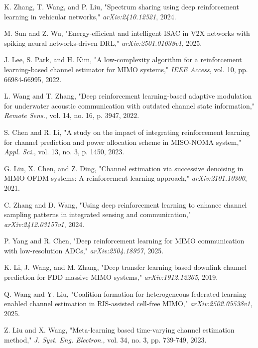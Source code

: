 \documentclass[journal,twocolumn]{IEEEtran}
\begin{document}
\begin{thebibliography}{20}
K. Zhang, T. Wang, and P. Liu, "Spectrum sharing using deep reinforcement learning in vehicular networks," \emph{arXiv:2410.12521}, 2024.

M. Sun and Z. Wu, "Energy-efficient and intelligent ISAC in V2X networks with spiking neural networks-driven DRL," \emph{arXiv:2501.01038v1}, 2025.

J. Lee, S. Park, and H. Kim, "A low-complexity algorithm for a reinforcement learning-based channel estimator for MIMO systems," \emph{IEEE Access}, vol. 10, pp. 66984-66995, 2022.

L. Wang and T. Zhang, "Deep reinforcement learning-based adaptive modulation for underwater acoustic communication with outdated channel state information," \emph{Remote Sens.}, vol. 14, no. 16, p. 3947, 2022.

S. Chen and R. Li, "A study on the impact of integrating reinforcement learning for channel prediction and power allocation scheme in MISO-NOMA system," \emph{Appl. Sci.}, vol. 13, no. 3, p. 1450, 2023.

G. Liu, X. Chen, and Z. Ding, "Channel estimation via successive denoising in MIMO OFDM systems: A reinforcement learning approach," \emph{arXiv:2101.10300}, 2021.

C. Zhang and D. Wang, "Using deep reinforcement learning to enhance channel sampling patterns in integrated sensing and communication," \emph{arXiv:2412.03157v1}, 2024.

P. Yang and R. Chen, "Deep reinforcement learning for MIMO communication with low-resolution ADCs," \emph{arXiv:2504.18957}, 2025.

K. Li, J. Wang, and M. Zhang, "Deep transfer learning based downlink channel prediction for FDD massive MIMO systems," \emph{arXiv:1912.12265}, 2019.

Q. Wang and Y. Liu, "Coalition formation for heterogeneous federated learning enabled channel estimation in RIS-assisted cell-free MIMO," \emph{arXiv:2502.05538v1}, 2025.

Z. Liu and X. Wang, "Meta-learning based time-varying channel estimation method," \emph{J. Syst. Eng. Electron.}, vol. 34, no. 3, pp. 739-749, 2023.


\end{thebibliography}
\end{document}
